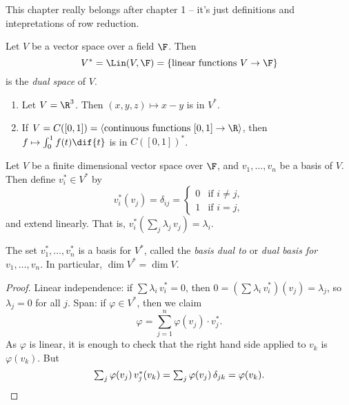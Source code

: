 \setcounter{lecture}{4}
This chapter really belongs after chapter 1 -- it's just definitions and intepretations of row reduction.

\begin{definition}
	Let $V$ be a vector space over a field $\F$. Then %
	\begin{equation*}
		V^* = \Lin(V,\F) = \left\{\text{linear functions } V\to\F\right\}
	\end{equation*}
	is the \emph{dual space} of $V$.
\end{definition}

\begin{examples}
\mbox{}
\begin{enumerate}
	\shortskip
	\item Let $V=\R^3$. Then $(x,y,z) \mapsto x-y$ is in $ V^*$.
	\item If $V=C([0,1])=\left\langle \text{continuous functions } [0,1]\to\R \right\rangle$, then $f\mapsto\int_0^1 f(t)\dif{t}$ is in $C([0,1])^*$. %
\end{enumerate}
\end{examples}

\begin{definition}
	Let $V$ be a finite dimensional vector space over $\F$, and $v_1,\ldots,v_n$ be a basis of $V$. Then define $v_i^*\in V^*$ by %
	\begin{equation*}
		v_i^*(v_j) = \delta_{ij} =
		\begin{cases}
			0 & \text{if } i\neq j, \\ %
			1 & \text{if } i=j,
		\end{cases}
	\end{equation*}
	and extend linearly. That is, $v_i^*\left( \sum_j \lambda_j\,v_j \right) = \lambda_i$.
\end{definition}

\begin{lemma}
	The set $v_1^*,\ldots,v_n^*$ is a basis for $V^*$, called the \emph{basis dual to} or \emph{dual basis for} $v_1,\ldots,v_n$. In particular, $\dim V^*=\dim V$. %
\end{lemma}

\begin{proof}
	Linear independence: if $\sum \lambda_i\,v_i^*=0$, then $0=\left( \sum \lambda_i \, v_i^* \right) (v_j) = \lambda_j$, so $\lambda_j=0$ for all $j$. Span: if $\varphi\in V^*$, then we claim %
	\begin{equation*}
		\varphi = \sum_{j=1}^n \varphi(v_j) \cdot v_j^*.
	\end{equation*}
	As $\varphi$ is linear, it is enough to check that the right hand side %
	applied to $v_k$ is $\varphi(v_k)$. But %
	\begin{equation*}
		\textstyle \sum_j \varphi(v_j) \, v_j^* (v_k) = \sum_j \varphi(v_j) \, \delta_{jk} = \varphi(v_k). \qedhere %
	\end{equation*}
\end{proof}


